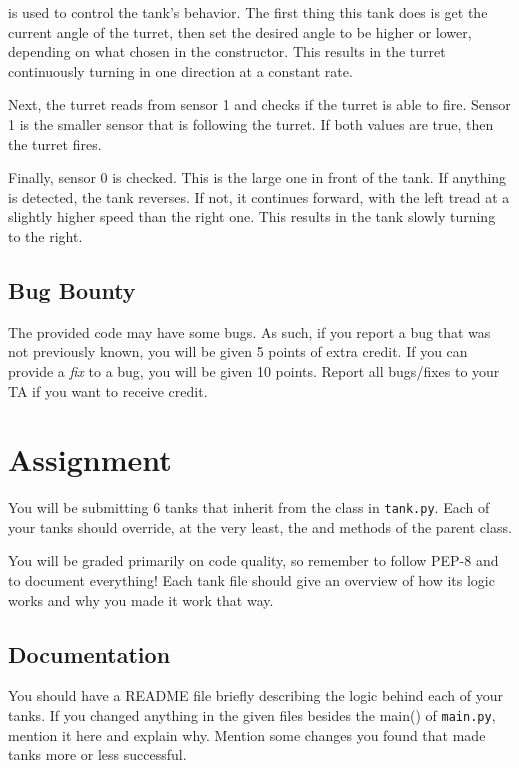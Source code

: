 \documentclass[11pt]{cselabheader}
\begin{document}
 is used to control the tank's behavior. The first thing this
tank does is get the current angle of the turret, then set the desired angle to
be higher or lower, depending on what chosen in the constructor. This results
in the turret continuously turning in one direction at a constant rate.

Next, the turret reads from sensor 1 and checks if the turret is able to fire.
Sensor 1 is the smaller sensor that is following the turret. If both values are
true, then the turret fires.

Finally, sensor 0 is checked. This is the large one in front of the tank. If
anything is detected, the tank reverses. If not, it continues forward, with the
left tread at a slightly higher speed than the right one. This results in the
tank slowly turning to the right.

\subsection{Bug Bounty}
The provided code may have some bugs.  As such, if you report a bug
that was not previously known, you will be given 5 points of extra
credit. If you can provide a \emph{fix} to a bug, you will be given 10
points. Report all bugs/fixes to your TA if you want to receive
credit.

\section{Assignment}
\label{subsec:ex}
You will be submitting 6 tanks that inherit from the  class
in \texttt{tank.py}. Each of your tanks should override, at the very least,
the  and  methods of
the parent class.

You will be graded primarily on code quality, so remember to follow PEP-8 and
to document everything! Each tank file should give an overview of how its logic
works and why you made it work that way.

\subsection{Documentation}
\begin{ex}
You should have a README file briefly describing the logic behind each of your
tanks. If you changed anything in the given files besides the main() of
\texttt{main.py}, mention it here and explain why. Mention some changes you
found that made tanks more or less successful.

\end{ex}
\end{document}
